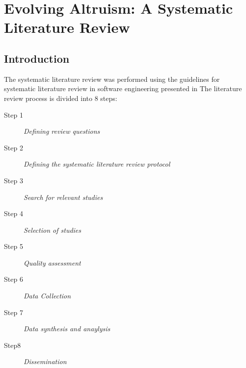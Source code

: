 \documentclass[a4paper]{book}
\begin{document}



\chapter{Evolving Altruism: A Systematic Literature Review}\label{T-B}
\label{cha:STL}

\section{Introduction}
\label{sec:STLintro}

The systematic literature review was performed using the guidelines for systematic 
literature review in software engineering presented in \cite{07guidelinesfor}
The literature review process is divided into 8 steps: %

\begin{description}
\item[Step 1] {\it Defining review questions}

\item[Step 2] {\it Defining the systematic literature review protocol}

\item[Step 3] {\it Search for relevant studies}

\item[Step 4] {\it Selection of studies}

\item[Step 5] {\it Quality assessment}

\item[Step 6] {\it Data Collection}

\item[Step 7] {\it Data synthesis and anaylysis}

\item[Step8] {\it Dissemination}

\end{description}
\end{document}
